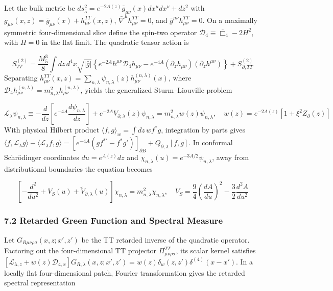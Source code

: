 \documentclass[aps,prd,onecolumn,superscriptaddress,nofootinbib,longbibliography,10pt]{revtex4-2}
\begin{document}
Let the bulk metric be \(ds_5^2 = e^{-2A(z)}\bar{g}_{\mu\nu}(x)dx^\mu dx^\nu + dz^2\) with \(g_{\mu\nu}(x,z) = \bar{g}_{\mu\nu}(x) + h_{\mu\nu}^{TT}(x,z)\), \(\bar{\nabla}^\mu h_{\mu\nu}^{TT} = 0\), and \(\bar{g}^{\mu\nu}h_{\mu\nu}^{TT} = 0\). On a maximally symmetric four-dimensional slice define the spin-two operator \(\mathcal{D}_4 \equiv \bar{\Box}_4 - 2H^2\), with \(H = 0\) in the flat limit. The quadratic tensor action is


\[S_{TT}^{(2)} = \frac{M_5^3}{8}\int dz\,d^4x \sqrt{|\bar{g}|} \left\{ e^{-2A}h^{\mu\nu}\mathcal{D}_4 h_{\mu\nu} - e^{-4A}(\partial_z h_{\mu\nu})(\partial_z h^{\mu\nu}) \right\} + S_{\partial,TT}^{(2)}\]
Separating \(h_{\mu\nu}^{TT}(x,z) = \sum_{n,\lambda}\psi_{n,\lambda}(z)h_{\mu\nu}^{(n,\lambda)}(x)\), where \(\mathcal{D}_4 h_{\mu\nu}^{(n,\lambda)} = m_{n,\lambda}^2 h_{\mu\nu}^{(n,\lambda)}\), yields the generalized Sturm--Liouville problem


\[\mathcal{L}_\lambda \psi_{n,\lambda} \equiv -\frac{d}{dz}\left[ e^{-4A}\frac{d\psi_{n,\lambda}}{dz} \right] + e^{-2A}V_{\partial,\lambda}(z)\psi_{n,\lambda} = m_{n,\lambda}^2 w(z)\psi_{n,\lambda}, \quad w(z) = e^{-2A(z)}[1 + \xi^2 Z_\partial(z)]\]
With physical Hilbert product \(\langle f, g\rangle_w = \int dz\, w f^* g\), integration by parts gives \(\langle f, \mathcal{L}_\lambda g\rangle - \langle \mathcal{L}_\lambda f, g\rangle = \left[ e^{-4A}(g f^{*\prime} - f^* g') \right]_{\partial B} + Q_{\partial,\lambda}[f, g]\). In conformal Schr\"odinger coordinates \(du = e^{A(z)}dz\) and \(\chi_{n,\lambda}(u) = e^{-3A/2}\psi_{n,\lambda}\), away from distributional boundaries the equation becomes


\[\left[ -\frac{d^2}{du^2} + V_S(u) + \tilde{V}_{\partial,\lambda}(u) \right]\chi_{n,\lambda} = m_{n,\lambda}^2 \chi_{n,\lambda}, \quad V_S = \frac{9}{4}\left(\frac{dA}{du}\right)^2 - \frac{3}{2}\frac{d^2 A}{du^2}\]


\subsubsection*{7.2 Retarded Green Function and Spectral Measure}

Let \(G_{R\mu\nu\rho\sigma}(x,z; x',z')\) be the TT retarded inverse of the quadratic operator. Factoring out the four-dimensional TT projector \(\Pi_{\mu\nu\rho\sigma}^{TT}\), its scalar kernel satisfies \([\mathcal{L}_{\lambda,z} + w(z)\mathcal{D}_{4,x}]G_{R,\lambda}(x,z; x',z') = w(z)\delta_w(z,z')\delta^{(4)}(x - x')\). In a locally flat four-dimensional patch, Fourier transformation gives the retarded spectral representation
\end{document}
